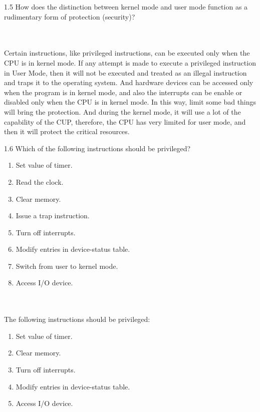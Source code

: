 \documentclass[12pt]{article}
\newenvironment{sol}[1][Solution]{\begin{trivlist}\item[\hskip\labelsep {\bfseries #1:}]}{\end{trivlist}}
\begin{document}
\begin{enumerate}
    \item 1.5 How does the distinction between kernel mode and user mode function as a rudimentary form of protection (security)?
    \begin{sol}
    \hspace*{\fill} \\
    \\
    Certain instructions, like privileged instructions, can be executed only when the CPU is in kernel mode. If any attempt is made to execute a privileged instruction in User Mode, then it will not be executed and treated as an illegal instruction and traps it to the operating system. And hardware devices can be accessed only when the program is in kernel mode, and also the interrupts can be enable or disabled only when the CPU is in kernel mode. In this way, limit some bad things will bring the protection. And during the kernel mode, it will use a lot of the capability of the CUP, therefore, the CPU has very limited for user mode, and then it will protect the critical resources.
    \end{sol}
    \newpage
    \item 1.6 Which of the following instructions should be privileged? 
    \begin{enumerate}
        \item Set value of timer.
        \item Read the clock.
        \item Clear memory.
        \item Issue a trap instruction.
        \item Turn off interrupts.
        \item Modify entries in device-status table.
        \item Switch from user to kernel mode.
        \item Access I/O device.
    \end{enumerate}
    \begin{sol}
        \hspace*{\fill} \\
        \\
        The following instructions should be privileged:
        \begin{enumerate}
            \item[(a)] Set value of timer.
            \item[(c)] Clear memory.
            \item[(e)] Turn off interrupts.
            \item[(f)] Modify entries in device-status table.
            \item[(h)] Access I/O device.
        \end{enumerate}
    \end{sol}
    \newpage


\end{enumerate}
\end{document}
